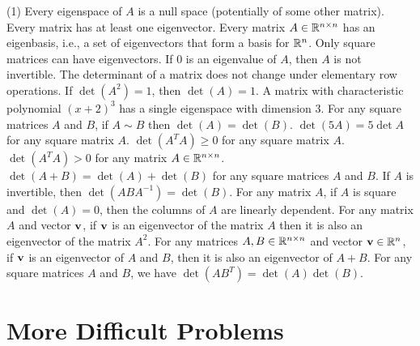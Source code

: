 \begin{tasks}[resume, style=enumerate](1)
\task
  Every eigenspace of $A$ is a null space (potentially of some other
  matrix).
\task
  Every matrix has at least one eigenvector.
\task
  Every matrix $A \in \mathbb R^{n \times n}$ has an eigenbasis, i.e.,
  a set of eigenvectors that form a basis for $\mathbb R^n$.
\task
  Only square matrices can have eigenvectors.
\task
  If $0$ is an eigenvalue of $A$, then $A$ is not invertible.
\task
  The determinant of a matrix does not change under elementary row
  operations.
\task
  If $\det (A^2) = 1$, then $\det (A) = 1$.
\task
  A matrix with characteristic polynomial $(x+2)^3$ has a single
  eigenspace with dimension $3$.
\task
  For any square matrices $A$ and $B$, if $A \sim B$ then $\det(A) =
  \det(B)$.
\task
  $\det(5A) = 5\det A$ for any square matrix $A$.
\task
  $\det(A^TA) \geq 0$ for any square matrix $A$.
\task
  $\det(A^TA) > 0$ for any matrix $A \in \mathbb R^{n \times n}$.
\task
  $\det(A + B) = \det(A) + \det(B)$ for any square matrices $A$ and
  $B$.
\task
  If $A$ is invertible, then $\det(ABA^{-1}) = \det(B)$.
\task
  For any matrix $A$, if $A$ is square and $\det(A) = 0$, then the
  columns of $A$ are linearly dependent.
\task
  For any matrix $A$ and vector $\mathbf v$, if $\mathbf v$ is an eigenvector of
  the matrix $A$ then it is also an eigenvector of the matrix $A^2$.
\task
  For any matrices $A, B \in \mathbb R^{n \times n}$ and vector $\mathbf v \in
  \mathbb R^n$, if $\mathbf v$ is an eigenvector of $A$ and $B$, then it is also an
  eigenvector of $A + B$.
\task
  For any square matrices $A$ and $B$, we have $\det(AB^T) =
  \det(A)\det(B)$.
\end{tasks}

\section{More Difficult Problems}

